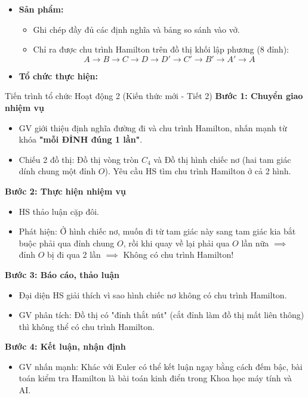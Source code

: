 \documentclass[12pt, a4paper]{article}
\begin{document}
\begin{itemize}[leftmargin=1.2cm]
    \item[c)] \textbf{Sản phẩm:}
    \begin{itemize}[leftmargin=0.6cm]
        \item Ghi chép đầy đủ các định nghĩa và bảng so sánh vào vở.
        \item Chỉ ra được chu trình Hamilton trên đồ thị khối lập phương (8 đỉnh):
        $$A \to B \to C \to D \to D' \to C' \to B' \to A' \to A$$
    \end{itemize}

    \item[d)] \textbf{Tổ chức thực hiện:}
\end{itemize}

\begin{pedabox}{Tiến trình tổ chức Hoạt động 2 (Kiến thức mới - Tiết 2)}
    \textbf{Bước 1: Chuyển giao nhiệm vụ}
    \begin{itemize}[leftmargin=0.6cm]
        \item GV giới thiệu định nghĩa đường đi và chu trình Hamilton, nhấn mạnh từ khóa \textbf{"mỗi ĐỈNH đúng 1 lần"}.
        \item Chiếu 2 đồ thị: Đồ thị vòng tròn $C_4$ và Đồ thị hình chiếc nơ (hai tam giác dính chung một đỉnh $O$). Yêu cầu HS tìm chu trình Hamilton ở cả 2 hình.
    \end{itemize}

    \textbf{Bước 2: Thực hiện nhiệm vụ}
    \begin{itemize}[leftmargin=0.6cm]
        \item HS thảo luận cặp đôi.
        \item Phát hiện: Ở hình chiếc nơ, muốn đi từ tam giác này sang tam giác kia bắt buộc phải qua đỉnh chung $O$, rồi khi quay về lại phải qua $O$ lần nữa $\implies$ đỉnh $O$ bị đi qua 2 lần $\implies$ Không có chu trình Hamilton!
    \end{itemize}

    \textbf{Bước 3: Báo cáo, thảo luận}
    \begin{itemize}[leftmargin=0.6cm]
        \item Đại diện HS giải thích vì sao hình chiếc nơ không có chu trình Hamilton.
        \item GV phân tích: Đồ thị có "đỉnh thắt nút" (cắt đỉnh làm đồ thị mất liên thông) thì không thể có chu trình Hamilton.
    \end{itemize}

    \textbf{Bước 4: Kết luận, nhận định}
    \begin{itemize}[leftmargin=0.6cm]
        \item GV nhấn mạnh: Khác với Euler có thể kết luận ngay bằng cách đếm bậc, bài toán kiểm tra Hamilton là bài toán kinh điển trong Khoa học máy tính và AI.
    \end{itemize}
\end{pedabox}
\end{document}
